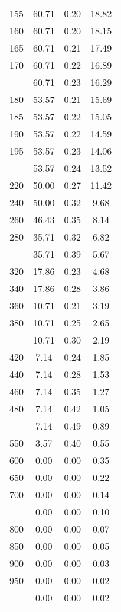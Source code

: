 \begin{table}[ht]
\begin{tabular}{lccc}
  155 & 60.71 & 0.20 & 18.82 \\ 
  160 & 60.71 & 0.20 & 18.15 \\ 
  165 & 60.71 & 0.21 & 17.49 \\ 
  170 & 60.71 & 0.22 & 16.89 \\ 
   \addlinespace
175 & 60.71 & 0.23 & 16.29 \\ 
  180 & 53.57 & 0.21 & 15.69 \\ 
  185 & 53.57 & 0.22 & 15.05 \\ 
  190 & 53.57 & 0.22 & 14.59 \\ 
  195 & 53.57 & 0.23 & 14.06 \\ 
   \addlinespace
200 & 53.57 & 0.24 & 13.52 \\ 
  220 & 50.00 & 0.27 & 11.42 \\ 
  240 & 50.00 & 0.32 & 9.68 \\ 
  260 & 46.43 & 0.35 & 8.14 \\ 
  280 & 35.71 & 0.32 & 6.82 \\ 
   \addlinespace
300 & 35.71 & 0.39 & 5.67 \\ 
  320 & 17.86 & 0.23 & 4.68 \\ 
  340 & 17.86 & 0.28 & 3.86 \\ 
  360 & 10.71 & 0.21 & 3.19 \\ 
  380 & 10.71 & 0.25 & 2.65 \\ 
   \addlinespace
400 & 10.71 & 0.30 & 2.19 \\ 
  420 & 7.14 & 0.24 & 1.85 \\ 
  440 & 7.14 & 0.28 & 1.53 \\ 
  460 & 7.14 & 0.35 & 1.27 \\ 
  480 & 7.14 & 0.42 & 1.05 \\ 
   \addlinespace
500 & 7.14 & 0.49 & 0.89 \\ 
  550 & 3.57 & 0.40 & 0.55 \\ 
  600 & 0.00 & 0.00 & 0.35 \\ 
  650 & 0.00 & 0.00 & 0.22 \\ 
  700 & 0.00 & 0.00 & 0.14 \\ 
   \addlinespace
750 & 0.00 & 0.00 & 0.10 \\ 
  800 & 0.00 & 0.00 & 0.07 \\ 
  850 & 0.00 & 0.00 & 0.05 \\ 
  900 & 0.00 & 0.00 & 0.03 \\ 
  950 & 0.00 & 0.00 & 0.02 \\ 
   \addlinespace
1000 & 0.00 & 0.00 & 0.02 \\ 
   \bottomrule
\end{tabular}
\end{table}
